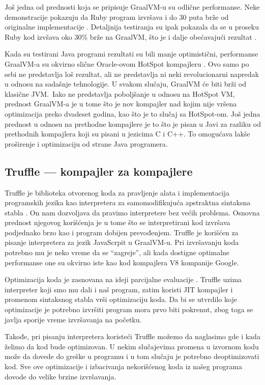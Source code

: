 \documentclass[a4paper]{article}
\begin{document}
Još jedna od prednosti koja se pripisuje GraalVM-u su odlične performanse. Neke demonstracije pokazuju da Ruby program izvršava i do 30 puta brže od originalne implementacije \cite{graalvm}. Detaljnija testiranja su ipak pokazala da se u proseku Ruby kod izvšava oko 30\% brže na GraalVM, što je i dalje obećavajući rezultat \cite{graalvm}.

Kada su testirani Java programi rezultati su bili manje optimistični, performanse GraalVM-a su okvirno slične Oracle-ovom HotSpot kompajleru \cite{graalvm}. Ovo samo po sebi ne predstavlja loš rezultat, ali ne predstavlja ni neki revolucionarni napredak u odnosu na sadašnje tehnologije. U svakom slučaju, GraalVM će biti brži od klasične JVM.\ Iako ne predstavlja poboljšanje u odnosu na HotSpot VM, prednost GraalVM-a je u tome što je nov kompajler nad kojim nije vršena optimizacija preko dvadeset godina, kao što je to slučaj sa HotSpot-om. Još jedna prednost u odnosu na prethodne kompajlere je to što je pisan u Javi za razliku od prethodnih kompajlera koji su pisani u jezicima C i C++. To omogućava lakše proširenje i optimizaciju od strane Java programera.

\subsection{Truffle --- kompajler za kompajlere}
\label{sub:truffle}

Truffle je biblioteka otvorenog koda za pravljenje alata i implementacija programskih jezika kao interpretera za samomodifikujuća apstraktna sintaksna stabla \cite{graalvm}. On nam dozvoljava da pravimo interpretere bez većih problema. Osnovna prednost njegovog korišćenja je u tome što se interpretirani kod izvršava podjednako brzo kao i program dobijen prevođenjem. Truffle je korišćen za pisanje interpretera za jezik JavaScrpit u GraalVM-u. Pri izvršavanju koda potrebno mu je neko vreme da se ``zagreje'', ali kada dostigne optimalne performanse one su okvirno iste kao kod kompajlera V8 kompanije Google.

Optimizacija koda je zasnovana na ideji parcijalne evaluacije \cite{graalvm}. Truffle uzima interpreter koji smo mu dali i naš program, zatim koristi JIT kompajler i promenom sintaksnog stabla vrši optimizaciju koda. Da bi se utvrdilo koje optimizacije je potrebno izvršiti program mora prvo biti pokrenut, zbog toga se javlja sporije vreme izvršavanja na početku.

Takođe, pri pisanju interpretera koristeći Truffle možemo da naglasimo gde i kada želimo da kod bude optimizovan. U nekim slučajevima promena u izvornom kodu može da dovede do greške u programu i u tom slučaju je potrebno deoptimizovati kod. Sve ove optimizacije i izbacivanja nekorišćenog koda iz našeg programa dovode do velike brzine izvršavanja.
\end{document}
